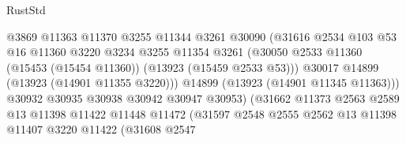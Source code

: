 \begin{lexlean}{RustStd}
\begin{coremodule}
                                        @3869
                                        @11363
                                        @11370
                                        @3255
                                        @11344
                                        @3261
                                        @30090
                                        (@31616
                                          @2534
                                          @103
                                          @53
                                          @16
                                          @11360
                                          @3220
                                          @3234
                                          @3255
                                          @11354
                                          @3261
                                          (@30050
                                            @2533
                                            @11360
                                            (@15453 (@15454 @11360))
                                            (@13923 (@15459 @2533 @53)))
                                          @30017
                                          @14899
                                          (@13923 (@14901 @11355 @3220)))
                                        @14899
                                        (@13923 (@14901 @11345 @11363)))
                                      @30932
                                      @30935
                                      @30938
                                      @30942
                                      @30947
                                      @30953)
                                    (@31662
                                      @11373
                                      @2563
                                      @2589
                                      @13
                                      @11398
                                      @11422
                                      @11448
                                      @11472
                                      (@31597
                                        @2548
                                        @2555
                                        @2562
                                        @13
                                        @11398
                                        @11407
                                        @3220
                                        @11422
                                        (@31608
                                          @2547

\end{coremodule}
\end{lexlean}
